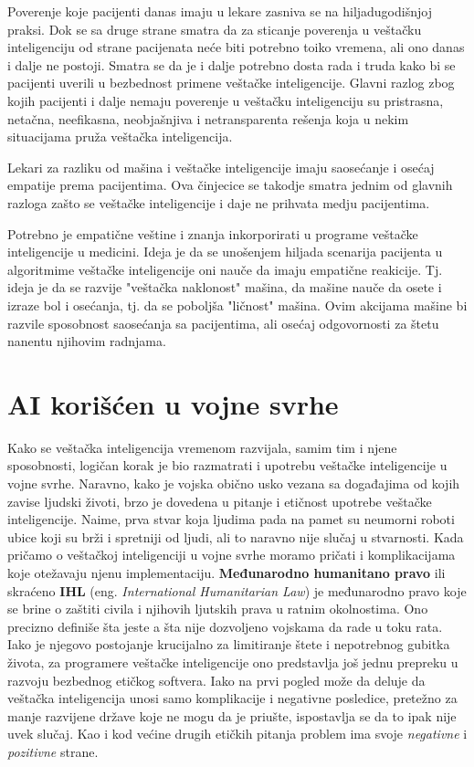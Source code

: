 \documentclass[a4paper]{article}
\begin{document}
Poverenje koje pacijenti danas imaju u lekare zasniva se na hiljadugodišnjoj praksi. Dok se sa druge strane smatra da za sticanje poverenja u veštačku inteligenciju od strane pacijenata neće biti potrebno toiko vremena, ali ono danas i dalje ne postoji. Smatra se da je i dalje potrebno dosta rada i truda kako bi se pacijenti uverili u bezbednost primene veštačke inteligencije. Glavni razlog zbog kojih pacijenti i dalje nemaju poverenje u veštačku inteligenciju su pristrasna, netačna, neefikasna, neobjašnjiva i netransparenta rešenja koja u nekim situacijama pruža veštačka inteligencija.

Lekari za razliku od mašina i veštačke inteligencije imaju saosećanje i osećaj empatije prema pacijentima. Ova činjecice se takodje smatra jednim od glavnih razloga zašto se veštačke inteligencije i daje ne prihvata medju pacijentima.

Potrebno je empatične veštine i znanja inkorporirati u programe veštačke inteligencije u medicini. Ideja je da se unošenjem hiljada scenarija pacijenta u algoritmime veštačke inteligencije oni nauče da imaju empatične reakicije. Tj. ideja je da se razvije "veštačka naklonost" mašina, da mašine nauče da osete i izraze bol i osećanja, tj. da se poboljša "ličnost" mašina. Ovim akcijama mašine bi razvile sposobnost saosećanja sa pacijentima, ali osećaj odgovornosti za štetu nanentu njihovim radnjama.



\section{AI korišćen u vojne svrhe}
\label{sec: AI korišćen u vojne svrhe}
Kako se veštačka inteligencija vremenom razvijala, samim tim i njene sposobnosti, logičan korak je bio razmatrati i upotrebu veštačke inteligencije u vojne svrhe. Naravno, kako je vojska obično usko vezana sa događajima od kojih zavise ljudski životi, brzo je dovedena u pitanje i etičnost upotrebe veštačke inteligencije. Naime, prva stvar koja ljudima pada na pamet su neumorni roboti ubice koji su brži i spretniji od ljudi, ali to naravno nije slučaj u stvarnosti.
\newline
\newline
Kada pričamo o veštačkoj inteligenciji u vojne svrhe moramo pričati i komplikacijama koje otežavaju njenu implementaciju. \textbf{Međunarodno humanitano pravo} ili skraćeno \textbf{IHL} (eng. \textit{International Humanitarian Law}) je međunarodno pravo koje se brine o zaštiti civila i njihovih ljutskih prava u ratnim okolnostima. Ono precizno definiše šta jeste a šta nije dozvoljeno vojskama da rade u toku rata. Iako je njegovo postojanje krucijalno za limitiranje štete i nepotrebnog gubitka života, za programere veštačke inteligencije ono predstavlja još jednu prepreku u razvoju bezbednog etičkog softvera.
\newline
\newline
Iako na prvi pogled može da deluje da veštačka inteligencija unosi samo komplikacije i negativne posledice, pretežno za manje razvijene države koje ne mogu da je priušte, ispostavlja se da to ipak nije uvek slučaj. Kao i kod većine drugih etičkih pitanja problem ima svoje \emph{negativne} i \emph{pozitivne} strane.
\end{document}
